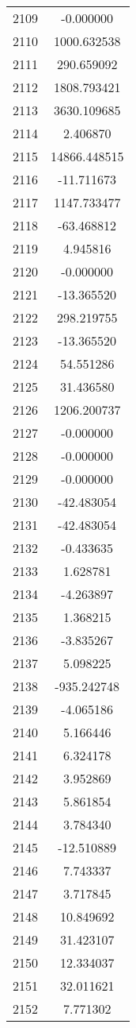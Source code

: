 \documentclass[12pt]{article}
\begin{document}
\begin{longtable}{@{}cc@{}}
2109 & -0.000000 \\
2110 & 1000.632538 \\
2111 & 290.659092 \\
2112 & 1808.793421 \\
2113 & 3630.109685 \\
2114 & 2.406870 \\
2115 & 14866.448515 \\
2116 & -11.711673 \\
2117 & 1147.733477 \\
2118 & -63.468812 \\
2119 & 4.945816 \\
2120 & -0.000000 \\
2121 & -13.365520 \\
2122 & 298.219755 \\
2123 & -13.365520 \\
2124 & 54.551286 \\
2125 & 31.436580 \\
2126 & 1206.200737 \\
2127 & -0.000000 \\
2128 & -0.000000 \\
2129 & -0.000000 \\
2130 & -42.483054 \\
2131 & -42.483054 \\
2132 & -0.433635 \\
2133 & 1.628781 \\
2134 & -4.263897 \\
2135 & 1.368215 \\
2136 & -3.835267 \\
2137 & 5.098225 \\
2138 & -935.242748 \\
2139 & -4.065186 \\
2140 & 5.166446 \\
2141 & 6.324178 \\
2142 & 3.952869 \\
2143 & 5.861854 \\
2144 & 3.784340 \\
2145 & -12.510889 \\
2146 & 7.743337 \\
2147 & 3.717845 \\
2148 & 10.849692 \\
2149 & 31.423107 \\
2150 & 12.334037 \\
2151 & 32.011621 \\
2152 & 7.771302 \\

\end{longtable}
\end{document}
